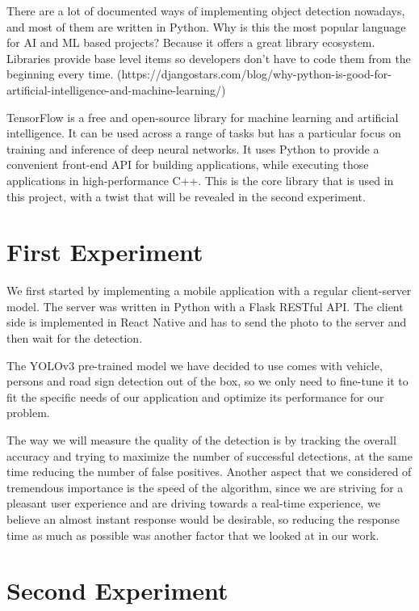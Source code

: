 \documentclass[runningheads,a4paper,11pt]{report}
\begin{document}
There are a lot of documented ways of implementing object detection nowadays, and most of them are written in Python. Why is this the most popular language for AI and ML based projects? Because it offers a great library ecosystem. Libraries provide base level items so developers don't have to code them from the beginning every time.
(https://djangostars.com/blog/why-python-is-good-for-artificial-intelligence-and-machine-learning/)

TensorFlow is a free and open-source library for machine learning and artificial intelligence. It can be used across a range of tasks but has a particular focus on training and inference of deep neural networks. It uses Python to provide a convenient front-end API for building applications, while executing those applications in high-performance C++. This is the core library that is used in this project, with a twist that will be revealed in the second experiment.

\section{First Experiment}
\label{section:firstExperiment}

We first started by implementing a mobile application with a regular client-server model. The server was written in Python with a Flask RESTful API. The client side is implemented in React Native and has to send the photo to the server and then wait for the detection. 

The YOLOv3 pre-trained model we have decided to use comes with vehicle, persons and road sign detection out of the box, so we only need to fine-tune it to fit the specific needs of our application and optimize its performance for our problem.

The way we will measure the quality of the detection is by tracking the overall accuracy and trying to maximize the number of successful detections, at the same time reducing the number of false positives. Another aspect that we considered of tremendous importance is the speed of the algorithm, since we are striving for a pleasant user experience and are driving towards a real-time experience,
we believe an almost instant response would be desirable, so reducing the response time as much as possible was another factor that we looked at in our work.


\section{Second Experiment}
\label{section:secondExperiment}
\end{document}
